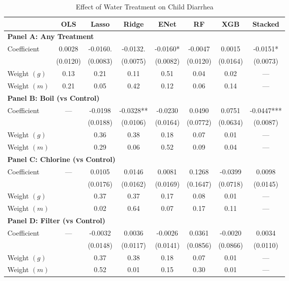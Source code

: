 \begin{table}[htbp]
\centering
\caption{Effect of Water Treatment on Child Diarrhea}
\label{tab:diarrhea_full}
\begin{tabular}{lccccccc}
\toprule
 & OLS & Lasso & Ridge & ENet & RF & XGB & Stacked \\
\midrule
\multicolumn{8}{l}{\textbf{Panel A: Any Treatment}} \\
\midrule
Coefficient & 0.0028 & -0.0160. & -0.0132. & -0.0160* & -0.0047 & 0.0015 & -0.0151* \\
 & (0.0120) & (0.0083) & (0.0075) & (0.0082) & (0.0120) & (0.0164) & (0.0073) \\
Weight $(g)$ & 0.13 & 0.21 & 0.11 & 0.51 & 0.04 & 0.02 & — \\
Weight $(m)$ & 0.21 & 0.05 & 0.42 & 0.12 & 0.06 & 0.14 & — \\

\multicolumn{8}{l}{\textbf{Panel B: Boil (vs Control)}} \\
\midrule
Coefficient & --- & -0.0198 & -0.0328** & -0.0230 & 0.0490 & 0.0751 & -0.0447*** \\
 &  & (0.0188) & (0.0106) & (0.0164) & (0.0772) & (0.0634) & (0.0087) \\
Weight $(g)$ &  & 0.36 & 0.38 & 0.18 & 0.07 & 0.01 & — \\
Weight $(m)$ &  & 0.29 & 0.06 & 0.52 & 0.09 & 0.04 & — \\

\multicolumn{8}{l}{\textbf{Panel C: Chlorine (vs Control)}} \\
\midrule
Coefficient & --- & 0.0105 & 0.0146 & 0.0081 & 0.1268 & -0.0399 & 0.0098 \\
 &  & (0.0176) & (0.0162) & (0.0169) & (0.1647) & (0.0718) & (0.0145) \\
Weight $(g)$ &  & 0.37 & 0.37 & 0.17 & 0.08 & 0.01 & — \\
Weight $(m)$ &  & 0.02 & 0.64 & 0.07 & 0.17 & 0.11 & — \\

\multicolumn{8}{l}{\textbf{Panel D: Filter (vs Control)}} \\
\midrule
Coefficient & --- & -0.0032 & 0.0036 & -0.0026 & 0.0361 & -0.0020 & 0.0034 \\
 &  & (0.0148) & (0.0117) & (0.0141) & (0.0856) & (0.0866) & (0.0110) \\
Weight $(g)$ &  & 0.37 & 0.38 & 0.18 & 0.07 & 0.01 & — \\
Weight $(m)$ &  & 0.52 & 0.01 & 0.15 & 0.30 & 0.01 & — \\


\end{tabular}
\end{table}
